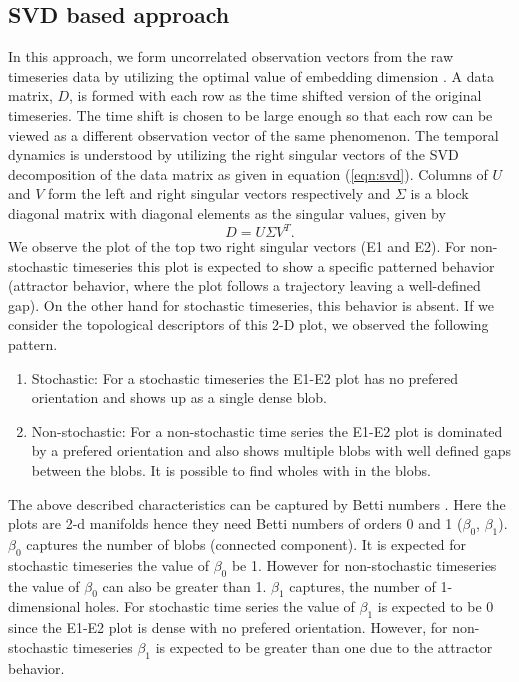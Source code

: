 \documentclass[10pt,conference]{IEEEtran}
\begin{document}
\subsection{SVD based approach}
In this approach, we form uncorrelated observation vectors from the raw timeseries data by utilizing the optimal value of embedding dimension \cite{misra2006}. A data matrix, $D$, is formed with each row  as the  time shifted version of the original timeseries. The time shift is chosen to be large enough so that each row can be viewed as a different observation vector of the same phenomenon. The temporal dynamics is understood by utilizing the right singular vectors of the SVD decomposition of the data matrix as given in equation (\ref{eqn:svd}). Columns of $U$ and $V$  form the left and right singular vectors respectively and $\Sigma$ is a block diagonal matrix with diagonal elements as the singular values, given by
\begin{equation}
  D = U \Sigma V^T.
  \label{eqn:svd}
\end{equation}
   We observe the plot of the top two right singular vectors (E1 and E2). For non-stochastic timeseries this plot is expected to show a specific patterned behavior (attractor behavior, where the plot follows a trajectory leaving a well-defined gap). On the other hand for stochastic timeseries, this behavior is absent.
If we consider the  topological descriptors of this 2-D plot, we observed the following pattern.
\begin{enumerate}
  \item Stochastic: For a stochastic timeseries the E1-E2 plot has no prefered orientation and shows up as a single dense blob.
  \item Non-stochastic: For a non-stochastic time series the E1-E2 plot is dominated by a prefered orientation and also shows multiple blobs with well defined gaps between the blobs. It is possible to find wholes with in the blobs.
  \end{enumerate}

The above described characteristics can be captured by Betti numbers \cite{jmlr}. Here the plots are 2-d manifolds hence they need Betti numbers of orders 0 and 1 ($\beta_{0}$, $\beta_{1}$).  $\beta_{0}$ captures the number of blobs (connected component). It is expected for stochastic timeseries the value of $\beta_{0}$ be 1. However for non-stochastic timeseries the value of $\beta_{0}$ can also be greater than 1. $\beta_1$ captures, the number of 1-dimensional holes. For stochastic time series the value of $\beta_1$ is expected to be 0 since the E1-E2 plot is dense with no prefered orientation. However, for non-stochastic timeseries $\beta_1$ is expected to be greater than one due to the attractor behavior.
\end{document}
